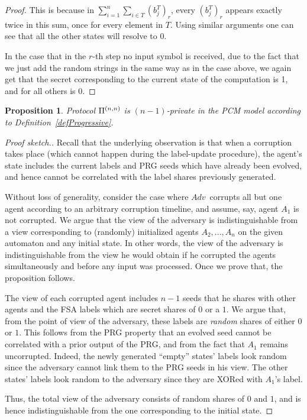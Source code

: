 \documentclass[letterpaper,11pt]{article}
\newcommand{\Ad}{$Adv$}
\newcommand{\nnPi}{{\rm {\Pi}}^{(n,n)}}
\newtheorem{proposition}[theorem]{Proposition}
\newenvironment{proofsk}{\begin{proof}[Proof sketch.]}
{\end{proof}}
\begin{document}
\begin {proof}
\noindent This is because in $ \sum_{i=1}^n \sum _{i \in T} (b_j^T)_r$, 
every $(b_j^T)_r$ appears exactly twice in this sum, once for
every 
element in $T$. 
Using similar arguments one can see that all the other
states will resolve to 0.  

In the case that in the $r$-th step no input symbol is received,
due to the fact that we just add the
random strings in the same way as in the case above,
we again get
that the secret corresponding to the current
state of the computation is 1, and for all others is 0.
\end {proof}


\begin{proposition}
\label{prop-pcm-all}
Protocol 
$\nnPi$ is $(n-1)$-private in the PCM model according to 
Definition~\ref{defProgressive}.
\end{proposition}
\begin {proofsk}
Recall that the underlying observation is that when a corruption takes place
(which cannot happen during the label-update procedure), the agent's state
includes the current labels and PRG seeds which have already been evolved, 
and hence cannot be correlated with the label shares previously
generated.

Without loss of generality, consider the case where \Ad\ corrupts
all but one agent according to an arbitrary corruption timeline,
and assume, say, agent $A_1$ is not corrupted.  We argue that the 
view of the adversary is indistinguishable from a 
view corresponding to
(randomly) initialized agents $A_2,...,A_n$ on the given automaton and
any initial state.  In other words, the view of the adversary is
indistinguishable from the view he would obtain if he corrupted the
agents simultaneously and before any input was processed.  Once we
prove that, the proposition follows.

The view of each corrupted agent includes $n-1$ seeds that he shares
with other agents and the FSA labels which are secret shares of $0$ or
a $1$.  We argue that, from the point of view of the adversary,
these labels are {\em random} shares 
of either $0$ or $1$.  This follows
from the PRG property that an evolved seed cannot be correlated with
a prior output of the PRG, and from the fact that $A_1$ remains uncorrupted.
Indeed, the newly generated ``empty'' states' labels look random since
the adversary cannot link them to the PRG seeds in his view.  The other
states' labels look random to the adversary since they are XORed
with $A_1$'s label.

Thus, the total view of the adversary consists of random shares of
$0$ and $1$, and is hence indistinguishable from the one corresponding
to the initial state.
\end{proofsk}
\end{document}
